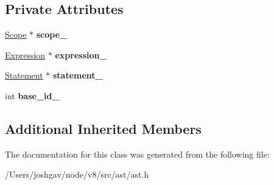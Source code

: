 \subsection*{Private Attributes}
\begin{DoxyCompactItemize}
\item 
\hyperlink{classv8_1_1internal_1_1_scope}{Scope} $\ast$ {\bfseries scope\+\_\+}\hypertarget{classv8_1_1internal_1_1_with_statement_aa09aefb901de6fb4c9ef704e795b52e7}{}\label{classv8_1_1internal_1_1_with_statement_aa09aefb901de6fb4c9ef704e795b52e7}

\item 
\hyperlink{classv8_1_1internal_1_1_expression}{Expression} $\ast$ {\bfseries expression\+\_\+}\hypertarget{classv8_1_1internal_1_1_with_statement_abc3acfd2cd781df070a41c59388dbb75}{}\label{classv8_1_1internal_1_1_with_statement_abc3acfd2cd781df070a41c59388dbb75}

\item 
\hyperlink{classv8_1_1internal_1_1_statement}{Statement} $\ast$ {\bfseries statement\+\_\+}\hypertarget{classv8_1_1internal_1_1_with_statement_a50d0253831b161102a734b75a8d416dd}{}\label{classv8_1_1internal_1_1_with_statement_a50d0253831b161102a734b75a8d416dd}

\item 
int {\bfseries base\+\_\+id\+\_\+}\hypertarget{classv8_1_1internal_1_1_with_statement_a07e19f9f4378ab18a73adf38912b15fe}{}\label{classv8_1_1internal_1_1_with_statement_a07e19f9f4378ab18a73adf38912b15fe}

\end{DoxyCompactItemize}
\subsection*{Additional Inherited Members}


The documentation for this class was generated from the following file\+:\begin{DoxyCompactItemize}
\item 
/\+Users/joshgav/node/v8/src/ast/ast.\+h\end{DoxyCompactItemize}
